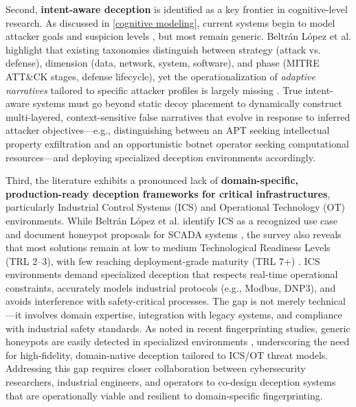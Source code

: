 Second, \textbf{intent-aware deception} is identified as a key frontier in cognitive-level research.
As discussed in \ref{cognitive modeling}, current systems begin to model attacker goals and suspicion
levels \cite{rowe2016introduction,ferguson2021examining,attackerdecision2025}, but most remain generic.
Beltrán López et al. highlight that existing taxonomies distinguish between strategy (attack vs. defense),
dimension (data, network, system, software), and phase (MITRE ATT\&CK stages, defense lifecycle), yet the
operationalization of \textit{adaptive narratives} tailored to specific attacker profiles is largely
missing \cite{deceptiontrends2024}. True intent-aware systems must go beyond static decoy placement to dynamically
construct multi-layered, context-sensitive false narratives that evolve in response to inferred attacker objectives—e.g.,
distinguishing between an APT seeking intellectual property exfiltration and an opportunistic botnet operator
seeking computational resources—and deploying specialized deception environments accordingly.

Third, the literature exhibits a pronounced lack of \textbf{domain-specific, production-ready deception frameworks
    for critical infrastructures}, particularly Industrial Control Systems (ICS) and Operational Technology (OT)
environments. While Beltrán López et al. identify ICS as a recognized use case and document honeypot proposals
for SCADA systems \cite{deceptiontrends2024}, the survey also reveals that most solutions remain at low to medium
Technological Readiness Levels (TRL 2--3), with few reaching deployment-grade maturity (TRL 7+) \cite{deceptiontrends2024}.
ICS environments demand specialized deception that respects real-time operational constraints, accurately models
industrial protocols (e.g., Modbus, DNP3), and avoids interference with safety-critical processes. The gap is not
merely technical—it involves domain expertise, integration with legacy systems, and compliance with industrial safety
standards. As noted in recent fingerprinting studies, generic honeypots are easily detected in specialized
environments \cite{sgfingerprint2023,otfingerprint2025}, underscoring the need for high-fidelity, domain-native
deception tailored to ICS/OT threat models. Addressing this gap requires closer collaboration between cybersecurity researchers,
industrial engineers, and operators to co-design deception systems that are operationally viable and resilient to domain-specific
fingerprinting.

